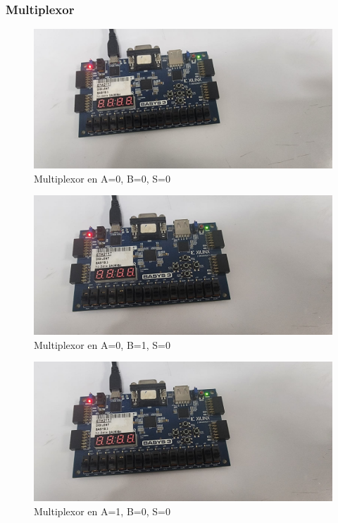 \documentclass[12pt]{article}  %
\begin{document}
\subsubsection*{Multiplexor}

\begin{figure}[!ht]
    \centering
    \caption{Multiplexor en A=0, B=0, S=0}
    \includegraphics[width=0.5\linewidth]{simulations/multiplex/multiplex0.jpg}
\end{figure}
\newpage
\begin{figure}[!ht]
    \centering
    \caption{Multiplexor en A=0, B=1, S=0}
    \includegraphics[width=1\linewidth]{simulations/multiplex/multiplex1.jpg}
\end{figure}
\begin{figure}[!ht]
    \centering
    \caption{Multiplexor en A=1, B=0, S=0}
    \includegraphics[width=1\linewidth]{simulations/multiplex/multiplex1.jpg}
\end{figure}
\newpage
\end{document}
